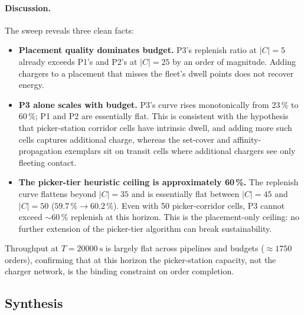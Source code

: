 \documentclass[conference]{IEEEtran}
\begin{document}
\paragraph{Discussion.} The sweep reveals three clean facts:
\begin{itemize}
  \item \textbf{Placement quality dominates budget.} P3's replenish ratio at $|C| = 5$ already exceeds P1's and P2's at $|C| = 25$ by an order of magnitude. Adding chargers to a placement that misses the fleet's dwell points does not recover energy.
  \item \textbf{P3 alone scales with budget.} P3's curve rises monotonically from 23\,\% to 60\,\%; P1 and P2 are essentially flat. This is consistent with the hypothesis that picker-station corridor cells have intrinsic dwell, and adding more such cells captures additional charge, whereas the set-cover and affinity-propagation exemplars sit on transit cells where additional chargers see only fleeting contact.
  \item \textbf{The picker-tier heuristic ceiling is approximately 60\,\%.} The replenish curve flattens beyond $|C| = 35$ and is essentially flat between $|C| = 45$ and $|C| = 50$ ($59.7\,\% \to 60.2\,\%$). Even with 50 picker-corridor cells, P3 cannot exceed $\sim 60\,\%$ replenish at this horizon. This is the placement-only ceiling: no further extension of the picker-tier algorithm can break sustainability.
\end{itemize}

Throughput at $T = \SI{20000}{\second}$ is largely flat across pipelines and budgets ($\approx 1750$ orders), confirming that at this horizon the picker-station capacity, not the charger network, is the binding constraint on order completion.

\subsection{Synthesis}
\label{sec:synthesis}
\end{document}
